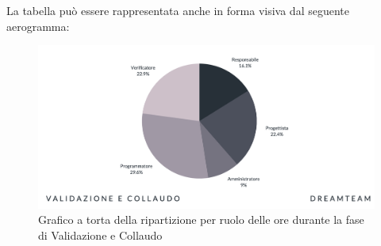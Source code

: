 La tabella può essere rappresentata anche in forma visiva dal seguente aerogramma:
\begin{figure}[H]
\centering
\includegraphics[scale=0.50]{Sezioni/SezioniPreventivo/grafici/validazione/Validazione_costi.png}
\caption{Grafico a torta della ripartizione per ruolo delle ore durante la fase di Validazione e Collaudo}
\end{figure}
